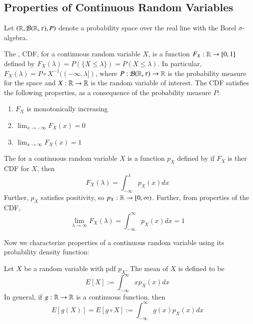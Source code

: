\documentclass[12pt, a4paper, oneside, openright, titlepage]{book}
\begin{document}
\subsection{Properties of Continuous Random Variables}

Let $(\mathbb R,\mathcal{B}(\mathbb R,\tau),P)$ denote a probability space over the real line with the Borel $\sigma$-algebra.

\begin{defn}
    The , CDF, for a continuous random variable $X$, is a function $F_X:\mathbb R\rightarrow [0,1]$ defined by $F_X(\lambda) = P(\{X\leq \lambda\}) = P(X\leq \lambda)$. In particular, $F_X(\lambda) = P\circ X^{-1}((-\infty, \lambda])$, where $P:\mathcal{B}(\mathbb R,\tau)\rightarrow \mathbb R$ is the probability measure for the space and $X:\mathbb R\rightarrow \mathbb R$ is the random variable of interest. The CDF satisfies the following properties, as a consequence of the probability measure $P$: \begin{enumerate}
        \item $F_X$ is monotonically increasing
        \item $\lim_{x\rightarrow -\infty}F_X(x) = 0$
        \item $\lim_{x\rightarrow \infty}F_X(x) = 1$
    \end{enumerate}
\end{defn}

\begin{defn}
    The  for a continuous random variable $X$ is a function $p_X$ defined by if $F_X$ is ther CDF for $X$, then \begin{equation*}
        F_X(\lambda) = \int_{-\infty}^{\lambda}p_X(x)dx
    \end{equation*}
    Further, $p_X$ satisfies positivity, so $p_X:\mathbb R\rightarrow [0,\infty)$. Further, from properties of the CDF, \begin{equation*}
        \lim\limits_{\lambda\rightarrow \infty}F_X(\lambda) = \int_{-\infty}^{\infty}p_X(x)dx = 1
    \end{equation*}
\end{defn}

Now we characterize properties of a continuous random variable using its probability density function: 

\begin{defn}
    Let $X$ be a random variable with pdf $p_X$. The mean of $X$ is defined to be \begin{equation*}
        E[X] := \int_{-\infty}^{\infty}xp_X(x)dx
    \end{equation*}
    In general, if $g:\mathbb R\rightarrow \mathbb R$ is a continuous function, then \begin{equation*}
        E[g(X)] = E[g\circ X] := \int_{-\infty}^{\infty}g(x)p_X(x)dx
    \end{equation*}
\end{defn}
\end{document}
